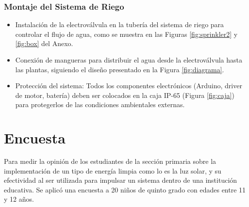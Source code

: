 \documentclass[12pt]{article}
\begin{document}
\subsubsection{Montaje del Sistema de Riego}
\begin{itemize}
      \item Instalación de la electroválvula en la tubería del sistema de riego para controlar el flujo de agua, como se muestra en las Figuras \ref{fig:sprinkler2} y \ref{fig:box} del Anexo.

      \item Conexión de mangueras para distribuir el agua desde la electroválvula hasta las plantas, siguiendo el diseño presentado en la Figura \ref{fig:diagrama}.

      \item Protección del sistema: Todos los componentes electrónicos (Arduino, driver de motor, batería) deben ser colocados en la caja IP-65 (Figura \ref{fig:caja}) para protegerlos de las condiciones ambientales externas.
\end{itemize}
\newpage
\section{Encuesta}
Para medir la opinión de los estudiantes de la sección primaria sobre la implementación de un tipo de energía limpia como lo es la luz solar, y su efectividad al ser utilizada para impulsar un sistema dentro de una institución educativa. Se aplicó una encuesta a 20 niños de quinto grado con edades entre 11 y 12 años.
\end{document}
